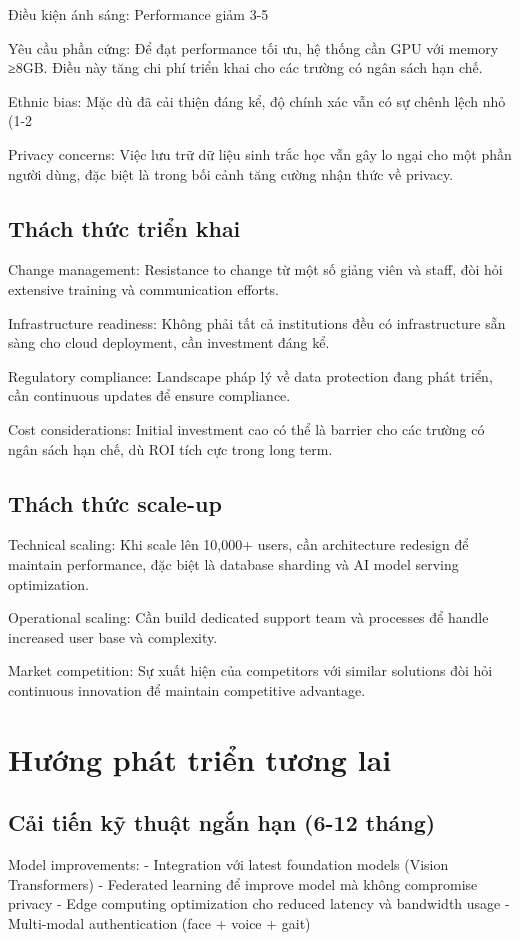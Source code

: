 \documentclass[12pt,a4paper]{report}
\begin{document}
Điều kiện ánh sáng: Performance giảm 3-5%

Yêu cầu phần cứng: Để đạt performance tối ưu, hệ thống cần GPU với memory ≥8GB. Điều này tăng chi phí triển khai cho các trường có ngân sách hạn chế.

Ethnic bias: Mặc dù đã cải thiện đáng kể, độ chính xác vẫn có sự chênh lệch nhỏ (1-2%

Privacy concerns: Việc lưu trữ dữ liệu sinh trắc học vẫn gây lo ngại cho một phần người dùng, đặc biệt là trong bối cảnh tăng cường nhận thức về privacy.

\subsection{Thách thức triển khai}
Change management: Resistance to change từ một số giảng viên và staff, đòi hỏi extensive training và communication efforts.

Infrastructure readiness: Không phải tất cả institutions đều có infrastructure sẵn sàng cho cloud deployment, cần investment đáng kể.

Regulatory compliance: Landscape pháp lý về data protection đang phát triển, cần continuous updates để ensure compliance.

Cost considerations: Initial investment cao có thể là barrier cho các trường có ngân sách hạn chế, dù ROI tích cực trong long term.

\subsection{Thách thức scale-up}
Technical scaling: Khi scale lên 10,000+ users, cần architecture redesign để maintain performance, đặc biệt là database sharding và AI model serving optimization.

Operational scaling: Cần build dedicated support team và processes để handle increased user base và complexity.

Market competition: Sự xuất hiện của competitors với similar solutions đòi hỏi continuous innovation để maintain competitive advantage.

\section{Hướng phát triển tương lai}
\subsection{Cải tiến kỹ thuật ngắn hạn (6-12 tháng)}
Model improvements:
- Integration với latest foundation models (Vision Transformers)
- Federated learning để improve model mà không compromise privacy
- Edge computing optimization cho reduced latency và bandwidth usage
- Multi-modal authentication (face + voice + gait)
\end{document}
